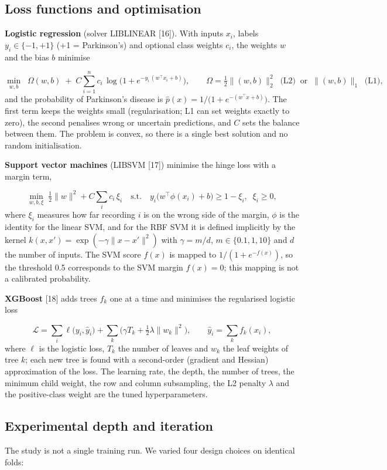 \documentclass[11pt,a4paper]{article}
\begin{document}
\subsection{Loss functions and optimisation}\label{sec:loss}
\textbf{Logistic regression} (solver LIBLINEAR [16]). With inputs $x_i$, labels $y_i \in \{-1,+1\}$ (+1 = Parkinson's) and optional class weights $c_i$, the weights $w$ and the bias $b$ minimise

\[\min_{w,b}\;\; \Omega(w,b) \;+\; C\sum_{i=1}^{n} c_i\,\log\!\big(1+e^{-y_i\,(w^\top x_i+b)}\big),\qquad \Omega=\tfrac12\lVert (w,b)\rVert_2^2\;\;\text{(L2)}\;\;\text{or}\;\;\lVert (w,b)\rVert_1\;\;\text{(L1)},\]
and the probability of Parkinson's disease is $\hat p(x) = 1/\big(1+e^{-(w^\top x+b)}\big)$. The first term keeps the weights small (regularisation; L1 can set weights exactly to zero), the second penalises wrong or uncertain predictions, and $C$ sets the balance between them. The problem is convex, so there is a single best solution and no random initialisation.

\textbf{Support vector machines} (LIBSVM [17]) minimise the hinge loss with a margin term,

\[\min_{w,b,\xi}\;\tfrac12\lVert w\rVert^2 + C\sum_i c_i\,\xi_i\quad\text{s.t.}\quad y_i\big(w^\top\phi(x_i)+b\big)\ge 1-\xi_i,\;\;\xi_i\ge 0,\]
where $\xi_i$ measures how far recording $i$ is on the wrong side of the margin, $\phi$ is the identity for the linear SVM, and for the RBF SVM it is defined implicitly by the kernel $k(x,x') = \exp(-\gamma\lVert x-x'\rVert^2)$ with $\gamma = m/d$, $m \in \{0.1, 1, 10\}$ and $d$ the number of inputs. The SVM score $f(x)$ is mapped to $1/(1+e^{-f(x)})$, so the threshold 0.5 corresponds to the SVM margin $f(x)=0$; this mapping is not a calibrated probability.

\textbf{XGBoost} [18] adds trees $f_k$ one at a time and minimises the regularised logistic loss

\[\mathcal{L}=\sum_i \ell\big(y_i,\hat y_i\big)+\sum_k\Big(\gamma T_k+\tfrac12\lambda\lVert w_k\rVert^2\Big),\qquad \hat y_i=\sum_k f_k(x_i),\]
where $\ell$ is the logistic loss, $T_k$ the number of leaves and $w_k$ the leaf weights of tree $k$; each new tree is found with a second-order (gradient and Hessian) approximation of the loss. The learning rate, the depth, the number of trees, the minimum child weight, the row and column subsampling, the L2 penalty $\lambda$ and the positive-class weight are the tuned hyperparameters.

\subsection{Experimental depth and iteration}\label{sec:experiments}
The study is not a single training run. We varied four design choices on identical folds:
\end{document}
